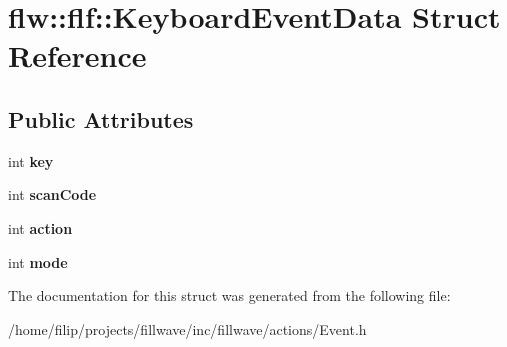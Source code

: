 \hypertarget{structflw_1_1flf_1_1KeyboardEventData}{}\section{flw\+:\+:flf\+:\+:Keyboard\+Event\+Data Struct Reference}
\label{structflw_1_1flf_1_1KeyboardEventData}
\subsection*{Public Attributes}
\begin{DoxyCompactItemize}
\item 
\mbox{\label{structflw_1_1flf_1_1KeyboardEventData_a2eee2bc4f3f58cdf4009b0677dacd0cc}} 
int {\bfseries key}
\item 
\mbox{\label{structflw_1_1flf_1_1KeyboardEventData_acd8697357c1dcfeca37bda6b6ba19eee}} 
int {\bfseries scan\+Code}
\item 
\mbox{\label{structflw_1_1flf_1_1KeyboardEventData_a306c515779fc9bf90b019a4fe4a51b97}} 
int {\bfseries action}
\item 
\mbox{\label{structflw_1_1flf_1_1KeyboardEventData_a022d96d5b0d3c683193e0ad1afbe39ef}} 
int {\bfseries mode}
\end{DoxyCompactItemize}


The documentation for this struct was generated from the following file\+:\begin{DoxyCompactItemize}
\item 
/home/filip/projects/fillwave/inc/fillwave/actions/Event.\+h\end{DoxyCompactItemize}
